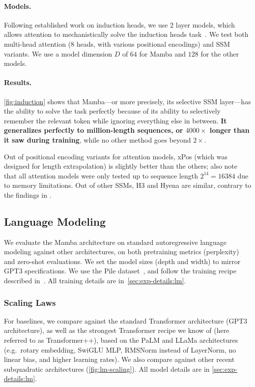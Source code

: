 \paragraph{Models.}
Following established work on induction heads, we use 2 layer models, which allows attention to mechanistically solve the induction heads task~\citep{olsson2022context}.
We test both multi-head attention (8 heads, with various positional encodings) and SSM variants. We use a model dimension $D$ of $64$ for Mamba and $128$ for the other models.

\paragraph{Results.}

\ref{fig:induction} shows that Mamba---or more precisely, its selective SSM layer---has the ability to solve the task perfectly because of its ability to selectively remember the relevant token while ignoring everything else in between.
\textbf{It generalizes perfectly to million-length sequences, or $4000\times$ longer than it saw during training}, while no other method goes beyond $2\times$.

Out of positional encoding variants for attention models, xPos (which was designed for length extrapolation) is slightly better than the others; also note that all attention models were only tested up to sequence length $2^{14}=16384$ due to memory limitations. Out of other SSMs, H3 and Hyena are similar, contrary to the findings in \citep{poli2023hyena}.

\subsection{Language Modeling}
\label{sec:exp:language}

We evaluate the Mamba architecture on standard autoregressive language modeling against other architectures, on both pretraining metrics (perplexity) and zero-shot evaluations. We set the model sizes (depth and width) to mirror GPT3 specifications. We use the Pile dataset~\citep{pile}, and follow the training recipe described in~\citep{brown2020language}. 
All training details are in~\ref{sec:exp-details:lm}.

  \subsubsection{Scaling Laws}

For baselines, we compare against the standard Transformer architecture (GPT3 architecture), as well as the strongest Transformer recipe we know of (here referred to as Transformer++), based on the PaLM and LLaMa architectures (e.g.\ rotary embedding, SwiGLU MLP, RMSNorm instead of LayerNorm, no linear bias, and higher learning rates). We also compare against other recent subquadratic architectures (\ref{fig:lm-scaling}).
All model details are in \ref{sec:exp-details:lm}.

